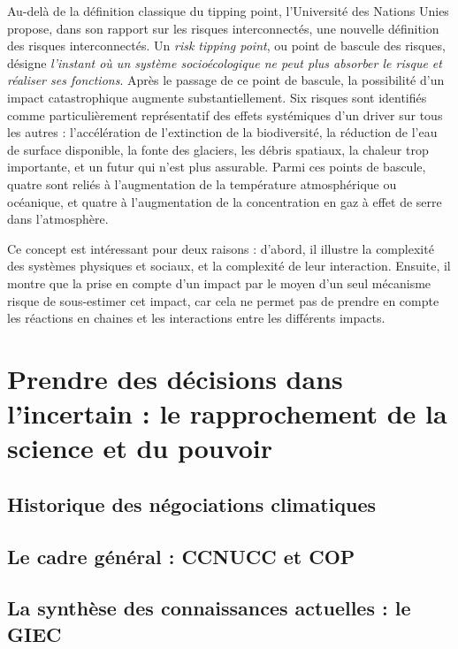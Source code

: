 Au-delà de la définition classique du tipping point, l'Université des Nations Unies propose, dans son rapport sur les risques interconnectés, une nouvelle définition des risques interconnectés. Un \textit{risk tipping point}, ou point de bascule des risques, désigne \textit{l'instant où un système socioécologique ne peut plus absorber le risque et réaliser ses fonctions}. Après le passage de ce point de bascule, la possibilité d'un impact catastrophique augmente substantiellement. Six risques sont identifiés comme particulièrement représentatif des effets systémiques d'un driver sur tous les autres : l'accélération de l'extinction de la biodiversité, la réduction de l'eau de surface disponible, la fonte des glaciers, les débris spatiaux, la chaleur trop importante, et un futur qui n'est plus assurable. Parmi ces points de bascule, quatre sont  reliés à l'augmentation de la température atmosphérique ou océanique, et quatre à l'augmentation de la concentration en gaz à effet de serre dans l'atmosphère. \cite{united_nations_university_-_institute_for_environment_and_human_security_unu-ehs_interconnected_2023}

Ce concept est intéressant pour deux raisons : d'abord, il illustre la complexité des systèmes physiques et sociaux, et la complexité de leur interaction. Ensuite, il montre que la prise en compte d'un impact par le moyen d'un seul mécanisme risque de sous-estimer cet impact, car cela ne permet pas de prendre en compte les réactions en chaines et les interactions entre les différents impacts. 

\section{Prendre des décisions dans l'incertain : le rapprochement de la science et du pouvoir}

\subsection{Historique des négociations climatiques}

\subsection{Le cadre général : CCNUCC et COP}

\subsection{La synthèse des connaissances actuelles : le GIEC}

